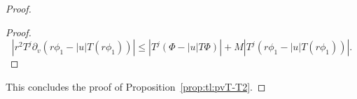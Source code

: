 \documentclass[11pt,english]{article}
\numberwithin{equation}{section}
\theoremstyle{remark}
\theoremstyle{plain}
\theoremstyle{remark}
\newcommand{\pu}{\partial_u}
\newcommand{\pv}{\partial_v}
\renewcommand{\(}{\left(}
\renewcommand{\)}{\right)}
\begin{document}
\begin{proof}
\begin{proof}
\begin{equation}
\left|r^2 T^j\pv\left(r\phi_1-|u|T(r\phi_1)\right)\right|\leq \left|T^j\left(\Phi-|u|T\Phi\right)\right|+M\left|T^j\left(r\phi_1-|u|T(r\phi_1)\right)\right|.
\end{equation}
%
\end{proof}
This concludes the proof of Proposition~\ref{prop:tl:pvT-T2}.
\end{proof}
\end{document}

